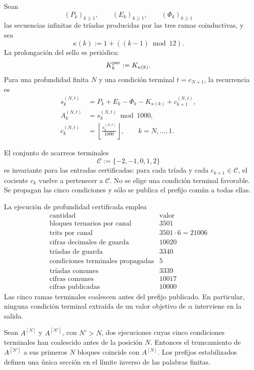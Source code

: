 Sean
\[
 (P_k)_{k\geq1},
 \qquad
 (E_k)_{k\geq1},
 \qquad
 (\Phi_k)_{k\geq1}
\]
las secuencias infinitas de tríadas producidas por las tres ramas
coinductivas, y sea
\[
 \kappa(k):=1+((k-1)\bmod12).
\]
La prolongación del sello es periódica:
\[
 K_k^{\rm per}:=K_{\kappa(k)}.
\]
Para una profundidad finita \(N\) y una condición terminal
\(t=c_{N+1}\), la recurrencia es
\begin{equation}
\begin{aligned}
 s_k^{(N,t)}
 &=P_k+E_k-\Phi_k-K_{\kappa(k)}+c_{k+1}^{(N,t)},\\
 A_k^{(N,t)}
 &=s_k^{(N,t)}\bmod1000,\\
 c_k^{(N,t)}
 &=\left\lfloor\frac{s_k^{(N,t)}}{1000}\right\rfloor,
 \qquad k=N,\ldots,1.
\end{aligned}
\label{p12-83-c10-s2:eq:recurrencia-larga-alpha}
\end{equation}

El conjunto de acarreos terminales
\[
 \mathcal C:=\{-2,-1,0,1,2\}
\]
es invariante para las entradas certificadas: para cada tríada y cada
\(c_{k+1}\in\mathcal C\), el cociente \(c_k\) vuelve a pertenecer a
\(\mathcal C\). No se elige una condición terminal favorable. Se propagan
las cinco condiciones y sólo se publica el prefijo común a todas ellas.

La ejecución de profundidad certificada emplea
\[
\begin{array}{c|r}
\text{cantidad}&\text{valor}\\ \hline
\text{bloques ternarios por canal}&3501\\
\text{trits por canal}&3501\cdot6=21006\\
\text{cifras decimales de guarda}&10020\\
\text{tríadas de guarda}&3340\\
\text{condiciones terminales propagadas}&5\\
\text{tríadas comunes}&3339\\
\text{cifras comunes}&10017\\
\text{cifras publicadas}&10000
\end{array}
\]
Las cinco ramas terminales coalescen antes del prefijo publicado. En
particular, ninguna condición terminal extraída de un valor objetivo de
\(\alpha\) interviene en la salida.

\begin{theorem}
\label{p12-83-c10-s2:thm:compatibilidad-prolongacion-alpha}
Sean \(A^{[N]}\) y \(A^{[N']}\), con \(N'>N\), dos ejecuciones cuyas
cinco condiciones terminales han coalescido antes de la posición \(N\).
Entonces el truncamiento de \(A^{[N']}\) a sus primeros \(N\) bloques
coincide con \(A^{[N]}\). Los prefijos estabilizados definen una única
sección en el límite inverso de las palabras finitas.
\end{theorem}

